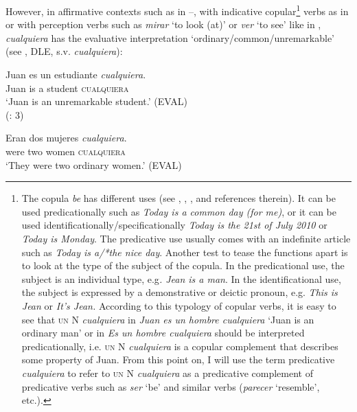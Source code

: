   \citep[2]{Menéndez-Benito2005}
\z

However, in affirmative contexts such as in –, with indicative copular\footnote{{The copula} {\textit{be}} {has different uses (see \citealt{Higgins1979}, \citealt{Zamparelli2000}, \citealt{Kellert2015}, and references therein). It can be used predicationally such as} {\textit{Today is a common day (for me)}}{, or it can be used identificationally/specificationally} {\textit{Today is the 21st of July 2010}} {or}{ \textit{Today is Monday}}{. The predicative use usually comes with an indefinite article such as} {\textit{Today is a/*the nice day}}{. Another test to tease the functions apart is to look at the type of the subject of the copula. In the predicational use, the subject is an individual type, e.g}{\textit{. Jean is a man}}{. In the identificational use, the subject is expressed by a demonstrative or deictic pronoun, e.g.} {\textit{This is Jean}} {or}{ \textit{It’s Jean.}} {According to this typology of copular verbs, it is easy to see that} \textsc{un} {N}{ \textit{cualquiera}} {in} {\textit{Juan es un hombre cualquiera}} {‘Juan is an ordinary man’ or in} {\textit{Es un hombre cualquiera}} {should be interpreted predicationally, i.e.} \textsc{un} {N}{ \textit{cualquiera}} {is a copular complement that describes some property of Juan. From this point on, I will use the term predicative} {\textit{cualquiera}} {to refer to} \textsc{un} {N} {\textit{cualquiera}} {as a predicative complement of predicative verbs such as} {\textit{ser}} {‘be’ and similar verbs (}{\textit{parecer}} {‘resemble’, etc.).}}  verbs as in   or with perception verbs such as \textit{mirar} ‘to look (at)’ or \textit{ver} ‘to see’ like in , \textit{cualquiera} has the evaluative interpretation ‘ordinary/common/unremarkable’ (see \citealt{Alonso-OvalleMenéndez-Benito2011,am2018}, DLE, s.v. \textit{cualquiera}):

\ea %
\label{bkm:Ref533761081} \gll Juan es un estudiante \textit{cualquiera}.\\
Juan is a student \textsc{cualquiera}\\
\glt ‘Juan is an unremarkable student.’ (EVAL)\\
  (\citealt{am2018}: 3)
\z


\ea %
\label{ex:key:41}
  \gll Eran dos mujeres \textit{cualquiera}.\\
were two women \textsc{cualquiera}\\
  \glt ‘They were two ordinary women.’ (EVAL)

